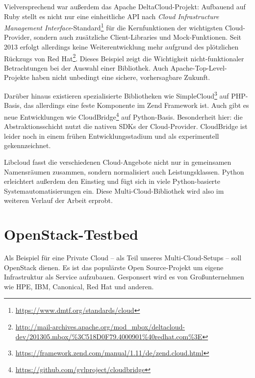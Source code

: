 \noindent Vielversprechend war außerdem das Apache DeltaCloud-Projekt: Aufbauend auf Ruby stellt es nicht nur eine einheitliche API nach \emph{Cloud Infrastructure Management Interface}-Standard\footnote{\url{https://www.dmtf.org/standards/cloud}} für die Kernfunktionen der wichtigsten Cloud-Provider, sondern auch zusätzliche Client-Libraries und Mock-Funktionen. Seit 2013 erfolgt allerdings keine Weiterentwicklung mehr aufgrund des plötzlichen Rückzugs von Red Hat\footnote{\url{http://mail-archives.apache.org/mod_mbox/deltacloud-dev/201305.mbox/\%3C518D0F79.4000901\%40redhat.com\%3E}}. Dieses Beispiel zeigt die Wichtigkeit nicht-funktionaler Betrachtungen bei der Auswahl einer Bibliothek. Auch Apache-Top-Level-Projekte haben nicht unbedingt eine sichere, vorhersagbare Zukunft.

Darüber hinaus existieren spezialisierte Bibliotheken wie SimpleCloud\footnote{\url{https://framework.zend.com/manual/1.11/de/zend.cloud.html}} auf PHP-Basis, das allerdings eine feste Komponente im Zend Framework ist. Auch gibt es neue Entwicklungen wie CloudBridge\footnote{\url{https://github.com/gvlproject/cloudbridge}} auf Python-Basis. Besonderheit hier: die Abstraktionsschicht nutzt die nativen SDKs der Cloud-Provider. CloudBridge ist leider noch in einem frühen Entwicklungsstadium und als experimentell gekennzeichnet.

Libcloud fasst die verschiedenen Cloud-Angebote nicht nur in gemeinsamen Namensräumen zusammen, sondern normalisiert auch Leistungsklassen. Python erleichtert außerdem den Einstieg und fügt sich in viele Python-basierte Systemautomatisierungen ein. Diese Multi-Cloud-Bibliothek wird also im weiteren Verlauf der Arbeit erprobt.


\section{OpenStack-Testbed}

Als Beispiel für eine Private Cloud -- als Teil unseres Multi-Cloud-Setups -- soll OpenStack dienen. Es ist das populärste Open Source-Projekt um eigene Infrastruktur als Service aufzubauen. Gesponsert wird es von Großunternehmen wie HPE, IBM, Canonical, Red Hat und anderen.

